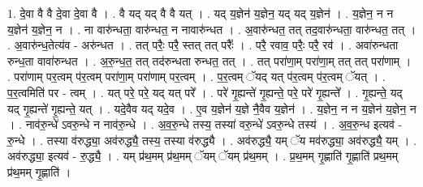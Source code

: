 \documentclass[17pt]{extarticle}
\begin{document}
1. दे॒वा वै वै दे॒वा दे॒वा वै । . वै यद् यद् वै वै यत् । . यद् य॒ज्ञेन॑ य॒ज्ञेन॒ यद् यद् य॒ज्ञेन॑ । . य॒ज्ञेन॒ न न य॒ज्ञेन॑ य॒ज्ञेन॒ न । . ना वारु॑न्धता॒ वारु॑न्धत॒ न नावारु॑न्धत । . अ॒वारु॑न्धत॒ तत् तद॒वारु॑न्धता॒ वारु॑न्धत॒ तत् । . अ॒वारु॑न्ध॒तेत्य॑व - अरु॑न्धत । . तत् परैः॒ परै॒ स्तत् तत् परैः᳚ । . परै॒ रवाव॒ परैः॒ परै॒ रव॑ । . अवा॑रुन्धता रुन्ध॒ता वावा॑रुन्धत । . अ॒रु॒न्ध॒त॒ तत् तद॑रुन्धता रुन्धत॒ तत् । . तत् परा॑णा॒म् परा॑णा॒म् तत् तत् परा॑णाम् । . परा॑णाम् पर॒त्वम् प॑र॒त्वम् परा॑णा॒म् परा॑णाम् पर॒त्वम् । . प॒र॒त्वम् ॅयद् यत् प॑र॒त्वम् प॑र॒त्वम् ॅयत् । . प॒र॒त्वमिति॑ पर - त्वम् । . यत् परे॒ परे॒ यद् यत् परे᳚ । . परे॑ गृ॒ह्यन्ते॑ गृ॒ह्यन्ते॒ परे॒ परे॑ गृ॒ह्यन्ते᳚ । . गृ॒ह्यन्ते॒ यद् यद् गृ॒ह्यन्ते॑ गृ॒ह्यन्ते॒ यत् । . यदे॒वैव यद् यदे॒व । . ए॒व य॒ज्ञेन॑ य॒ज्ञे नै॒वैव य॒ज्ञेन॑ । . य॒ज्ञेन॒ न न य॒ज्ञेन॑ य॒ज्ञेन॒ न । . नाव॑रु॒न्धे॑ ऽवरु॒न्धे न नाव॑रु॒न्धे । . अ॒व॒रु॒न्धे तस्य॒ तस्या॑ वरु॒न्धे॑ ऽवरु॒न्धे तस्य॑ । . अ॒व॒रु॒न्ध इत्यव॑ - रु॒न्धे । . तस्या व॑रुद्ध्या॒ अव॑रुद्ध्यै॒ तस्य॒ तस्या व॑रुद्ध्यै । . अव॑रुद्ध्यै॒ यम् ॅय मव॑रुद्ध्या॒ अव॑रुद्ध्यै॒ यम् । . अव॑रुद्ध्या॒ इत्यव॑ - रु॒द्ध्यै॒ । . यम् प्र॑थ॒मम् प्र॑थ॒मम् ॅयम् ॅयम् प्र॑थ॒मम् । . प्र॒थ॒मम् गृ॒ह्णाति॑ गृ॒ह्णाति॑ प्रथ॒मम् प्र॑थ॒मम् गृ॒ह्णाति॑ । \newline
\end{document}
